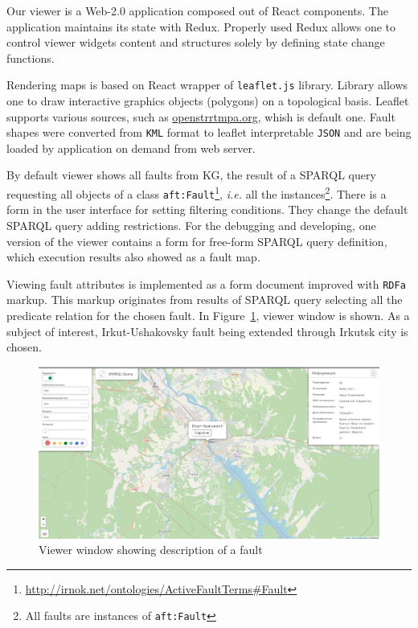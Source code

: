 \documentclass[
]{ceurart}
\begin{document}
Our viewer is a Web-2.0 application composed out of React components.  The application maintains its state with Redux. Properly used Redux allows one to control viewer widgets content and structures solely by defining state change functions.

Rendering maps is based on React wrapper of \texttt{leaflet.js} library.  Library allows one to draw interactive graphics objects (polygons) on a topological basis.  Leaflet supports various sources, such as \href{https://openstreetmap.org/}{openstrrtmpa.org}, whish is default one.  Fault shapes were converted from \texttt{KML} format to leaflet interpretable \texttt{JSON} and are being loaded by application on demand from web server.

By default viewer shows all faults from KG, the result of a SPARQL query requesting all objects of a class \texttt{aft:Fault}\footnote{\url{http://irnok.net/ontologies/ActiveFaultTerms\#Fault}}, \emph{i.e.} all the instances\footnote{All faults are instances of \texttt{aft:Fault}}.  There is a form in the user interface for setting filtering conditions.  They change the default SPARQL query adding restrictions.  For the debugging and developing, one version of the viewer contains a form for free-form SPARQL query definition, which execution results also showed as a fault map.

Viewing fault attributes is implemented as a form document improved with \texttt{RDFa} markup.  This markup originates from results of SPARQL query selecting all the predicate relation for the chosen fault.
%
%
In Figure~\ref{fig:ex}, viewer window is shown.  As a subject of interest, Irkut-Ushakovsky fault being extended through Irkutsk city is chosen.

\begin{figure}
  \centering
  \includegraphics[width=\linewidth]{faults-leaflet-doc.png}
  \caption{Viewer window showing description of a fault}
  \label{fig:ex}
\end{figure}
\end{document}
